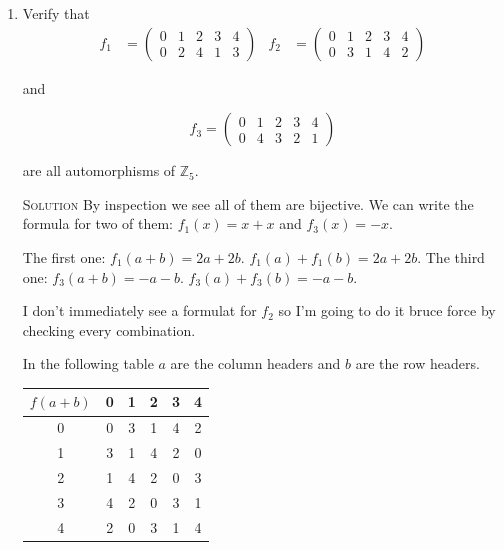 \documentclass[twoside]{amsart}
\newcommand{\Integers}{\ensuremath{\mathbb{Z}{}}\xspace}
\newcommand{\solution}{\textsc{Solution}\xspace}
\newcommand{\blank}{\vspace{5pt}}
\begin{document}
\begin{enumerate}[A.]
\begin{enumerate}[1]
      is an automorphism of $\Integers_6$.

      \blank \noindent \solution By inspeciton the function is bijective.

      The function $f$ can be restated as $f(x) = 0 - x$. $f(a+b) =
      0 - (a+b) = - a - b$. $f(a)+f(b) = -a - b$. These equal therefore
      $f$ is an automorphism.
      
      \blank
      \item Verify that
      \begin{align*}
         f_1 &=
            \begin{pmatrix}
               0 & 1 & 2 & 3 & 4 \\
               0 & 2 & 4 & 1 & 3
            \end{pmatrix}
            &
         f_2 &=
            \begin{pmatrix}
               0 & 1 & 2 & 3 & 4 \\
               0 & 3 & 1 & 4 & 2
            \end{pmatrix}
      \end{align*}

      and

      \[
         f_3 =
            \begin{pmatrix}
               0 & 1 & 2 & 3 & 4 \\
               0 & 4 & 3 & 2 & 1
            \end{pmatrix}
      \]

      are all automorphisms of $\Integers_5$.

      \blank \noindent \solution By inspection we see all of them are bijective.
      We can write the formula for two of them:
      $f_1(x) = x + x$ and $f_3(x) = -x$.

      The first one: $f_1(a+b) = 2a + 2b$. $f_1(a)+f_1(b) = 2a + 2b$.
      The third one: $f_3(a+b) = -a - b$. $f_3(a)+f_3(b) = -a - b$.

      I don't immediately see a formulat for $f_2$ so I'm going to do it
      bruce force by checking every combination.

      In the following table $a$ are the column headers and $b$ are the
      row headers.
      \begin{center}
      \begin{tabular}{c|ccccc}
         $f(a+b)$ & 0 & 1 & 2 & 3 & 4 \\ \hline
         0        & 0 & 3 & 1 & 4 & 2 \\
         1        & 3 & 1 & 4 & 2 & 0 \\
         2        & 1 & 4 & 2 & 0 & 3 \\
         3        & 4 & 2 & 0 & 3 & 1 \\
         4        & 2 & 0 & 3 & 1 & 4
      \end{tabular}
      \end{center}


\end{enumerate}
\end{enumerate}
\end{document}
